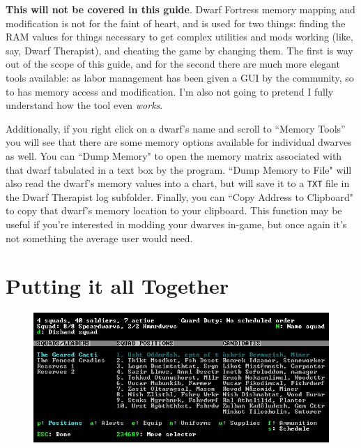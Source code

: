 \documentclass[]{article}
\begin{document}
{\begin{flushleft}
\textbf{This will not be covered in this guide}. Dwarf Fortress memory mapping and modification is not
for the faint of heart, and is used for two things: finding the RAM values for things necessary to get
complex utilities and mods working (like, say, Dwarf Therapist), and cheating the game by changing them.
The first is way out of the scope of this guide, and for the second there are much more elegant tools
available: as labor management has been given a GUI by the community, so to has memory access and
modification. I'm also not going to pretend I fully understand how the tool even \emph{works}.

Additionally, if you right click on a dwarf's name and scroll to ``Memory Tools'' you will see that there
are some memory options available for individual dwarves as well. You can ``Dump Memory" to open the
memory matrix associated with that dwarf tabulated in a text box by the program. ``Dump Memory to File"
will also read the dwarf's memory values into a chart, but will save it to a \texttt{TXT} file in the
Dwarf Therapist log subfolder. Finally, you can ``Copy Address to Clipboard" to copy that dwarf's memory
location to your clipboard. This function may be useful if you're interested in modding your dwarves
in-game, but once again it's not something the average user would need.
\end{flushleft}
}

\vfill \newpage

\newpage

\section{Putting it all Together}
\label{sec:Putting it all Together}

\begin{figure}[h!]
\includegraphics[width=\linewidth]{Sec5Fig1}
\end{figure}
\end{document}
